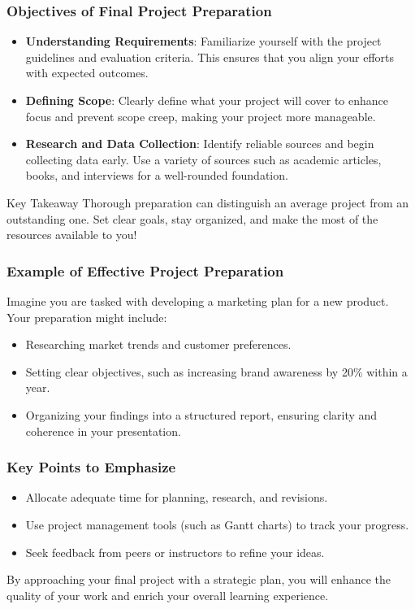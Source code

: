 \documentclass{beamer}
\begin{document}
\begin{frame}[fragile]
    \frametitle{Objectives of Final Project Preparation}
    \begin{itemize}
        \item \textbf{Understanding Requirements}: Familiarize yourself with the project guidelines and evaluation criteria. This ensures that you align your efforts with expected outcomes.
        
        \item \textbf{Defining Scope}: Clearly define what your project will cover to enhance focus and prevent scope creep, making your project more manageable.
        
        \item \textbf{Research and Data Collection}: Identify reliable sources and begin collecting data early. Use a variety of sources such as academic articles, books, and interviews for a well-rounded foundation.
    \end{itemize}
    \begin{block}{Key Takeaway}
        Thorough preparation can distinguish an average project from an outstanding one. Set clear goals, stay organized, and make the most of the resources available to you!
    \end{block}
\end{frame}

\begin{frame}[fragile]
    \frametitle{Example of Effective Project Preparation}
    Imagine you are tasked with developing a marketing plan for a new product. Your preparation might include:
    \begin{itemize}
        \item Researching market trends and customer preferences.
        \item Setting clear objectives, such as increasing brand awareness by 20\% within a year.
        \item Organizing your findings into a structured report, ensuring clarity and coherence in your presentation.
    \end{itemize}
\end{frame}

\begin{frame}[fragile]
    \frametitle{Key Points to Emphasize}
    \begin{itemize}
        \item Allocate adequate time for planning, research, and revisions.
        \item Use project management tools (such as Gantt charts) to track your progress.
        \item Seek feedback from peers or instructors to refine your ideas.
    \end{itemize}
    By approaching your final project with a strategic plan, you will enhance the quality of your work and enrich your overall learning experience.
\end{frame}
\end{document}
